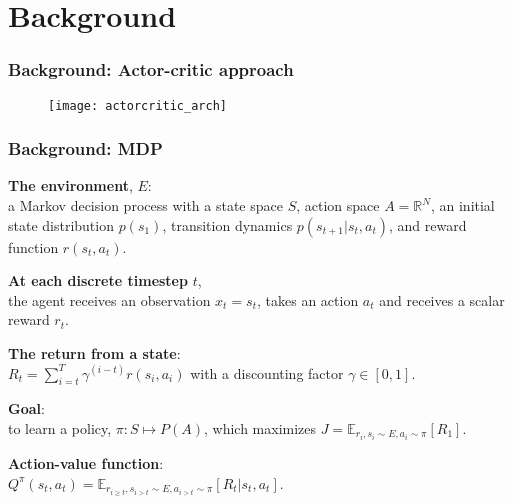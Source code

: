 \section{Background}

\begin{frame}
\frametitle{Background: Actor-critic approach}
\begin{figure}
    \centering
    \texttt{[image: actorcritic\_arch]}
\end{figure}
\end{frame}

\begin{frame}
\frametitle{Background: MDP}
\textbf{The environment}, $E$: \\
a Markov decision process with a state space $S$, action space $A = \mathbb{R}^N$,
an initial state distribution $p(s_1)$, transition dynamics $p(s_{t+1}|s_t, a_t)$, and
reward function $r(s_t, a_t)$.
\vspace{2.5mm}

\textbf{At each discrete timestep} $t$, \\
the agent receives an observation $x_t = s_t$,
takes an action $a_t$ and receives a scalar reward $r_t$.
\vspace{2.5mm}

\textbf{The return from a state}: \\
$R_t= \sum_{i=t}^T  \gamma^{(i-t)} r(s_i, a_i)$ with a discounting factor $\gamma \in [0, 1]$.
\vspace{2.5mm}

\textbf{Goal}: \\
to learn a policy, $\pi: S \mapsto P(A)$, which
maximizes $J = \mathbb{E}_{r_i,s_i \sim E,a_i \sim \pi} [R_1]$.
\vspace{2.5mm}

\textbf{Action-value function}:\\
$Q^{\pi}(s_t,a_t) = \mathbb{E}_{r_{i \ge t},s_{i>t} \sim E,a_{i>t} \sim \pi} [R_t|s_t,a_t]$.
\end{frame}

